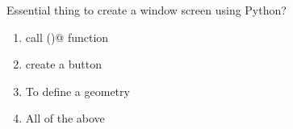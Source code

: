 \question
Essential thing to create a window screen using \lstinline@tkinter@ Python?

\begin{enumerate}
\item call \lstinline@tk()@ function
\item create a button
\item To define a geometry
\item All of the above
\end{enumerate}

